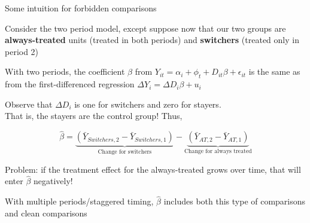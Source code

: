\documentclass[aspectratio = 169, 13pt]{beamer}
\begin{document}
\begin{frame}{Some intuition for forbidden comparisons}
  \begin{wideitemize}
    \item
    Consider the two period model, except suppose now that our two groups are \textbf{always-treated} units (treated in both periods) and \textbf{switchers} (treated only in period 2)

    \item
    With two periods, the coefficient  $\beta$ from $ Y_{it} = \alpha_i + \phi_t + D_{it} \beta  + \epsilon_{it}$ is the same as from the first-differenced regression  $\Delta Y_i = \Delta D_i \beta + u_i$
   
   \item
   Observe that $\Delta D_i$ is one for switchers and zero for stayers. \\ That is, the stayers are the control group! Thus,

    $$\hat\beta =  \underbrace{ \left(\bar{Y}_{Switchers, 2} - \bar{Y}_{Switchers, 1} \right) }_{\text{Change for switchers}} - \underbrace{ \left(\bar{Y}_{AT, 2} - \bar{Y}_{AT, 1} \right) }_{\text{Change for always treated}}  $$

    \item
    Problem: if the treatment effect for the always-treated grows over time, that will enter $\hat\beta$ negatively!

    \item
    With multiple periods/staggered timing, $\hat\beta$ includes both this type of comparisons and clean comparisons
  \end{wideitemize}
\end{frame}
\end{document}
